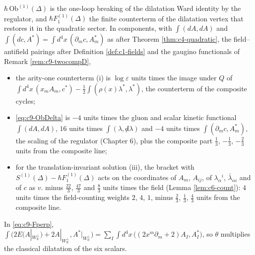 \begin{remark}
$\hbar\,\mathrm{Ob}^{(1)}(\Delta)$ is the one-loop breaking of the dilatation Ward identity by the regulator, and $\hbar F_1^{(1)}(\Delta)$ the finite counterterm of the dilatation vertex that restores it in the quadratic sector. In components, with $\int(dA,dA)$ and $\int(dc,A^*)=\int d^4x\,(\partial_mc,A^*_m)$ as after Theorem \ref{thm:c4-quadratic}, the field--antifield pairings after Definition \ref{def:c1-fields} and the gaugino functionals of Remark \ref{rem:c9-twocompD},
\begin{itemize}
\item the arity-one counterterm (i) is $\log\varepsilon$ units times the image under $Q$ of $\int d^4x\,(x_mA_m,c^*)-\tfrac12\int(\rho(x)\lambda^*,\lambda^*)$, the counterterm of the composite cycles;
\item \eqref{eq:c9-ObDelta} is $-4$ units times the gluon and scalar kinetic functional $\int(dA,dA)$, $16$ units times $\int(\lambda,{\not d}\lambda)$ and $-4$ units times $\int(\partial_mc,A^*_m)$, the scaling of the regulator (Chapter 6), plus the composite part $\tfrac13$, $-\tfrac13$, $-\tfrac23$ units from the composite line;
\item for the translation-invariant solution (iii), the bracket with $S^{(1)}(\Delta)-\hbar F_1^{(1)}(\Delta)$ acts on the coordinates of $A_m$, $A_{ij}$, of $\lambda_\alpha{}^i$, $\bar\lambda_{\dot\alpha i}$ and of $c$ as $v.$ minus $\tfrac{22}3$, $\tfrac{47}3$ and $\tfrac83$ units times the field (Lemma \ref{lem:c6-count}): $4$ units times the field-counting weights $2$, $4$, $1$, minus $\tfrac23$, $\tfrac13$, $\tfrac43$ units from the composite line.
\end{itemize}
In \eqref{eq:c9-Fperp}, $\int\big(2E(A|_{W_{\mathbb R}^\perp})+2A|_{W_{\mathbb R}^\perp},A^*|_{W_{\mathbb R}^\perp}\big)=\sum_I\int d^4x\,\big((2x^m\partial_m+2)A_I,A^*_I\big)$, so $\theta$ multiplies the classical dilatation of the six scalars.
\end{remark}

